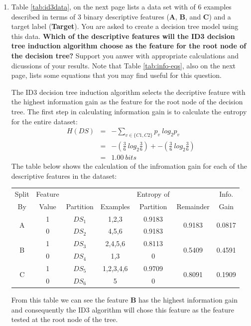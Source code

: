 \documentclass[solution]{ditpaper}
\begin{document}
\begin{enumerate}
\begin{enumerate}
     \end{enumerate}

		\item Table \ref{tab:id3data}, on the next page lists a data set with of 6 examples described in terms of 3 binary descriptive features (\textbf{A}, \textbf{B}, and \textbf{C}) and a target label (\textbf{Target}). You are asked to create a decision tree model using this data. \textbf{Which of the descriptive features will the ID3 decision tree induction algorithm choose as the feature for the root node of the decision tree?} Support you anwer with appropriate calculations and dicussions of your results. Note that Table \ref{tab:info-eqs}, also on the next page, lists some equations that you may find useful for this question.		
		\begin{answer}
		The ID3 decision tree induction algorithm selects the decriptive feature with the highest information gain as the feature for the root node of the decision tree.  The first step in calculating information gain is to calculate the entropy for the entire dataset:
	\begin{eqnarray*}
H\left(DS\right) &=& - \sum_{v \in \{C1,C2\}} p_v ~ log_2 p_v\\
		&=& -\left(\frac{3}{6}~ log_2 \frac{3}{6}\right) + -\left(\frac{3}{6} ~log_2 \frac{3}{6}\right)\\
		&=& 1.00~bits
	\end{eqnarray*}
	The table below shows the calculation of the infromation gain for each of the descriptive features in the dataset:
		\begin{scriptsize}
\begin{tabular}{ccccccc}
Split & Feature &              &  & Entropy of &  & Info.\\
By & Value & Partition  & Examples & Partition & Remainder & Gain\\
\hline
\multirow{2}{*}{A} & 1 & $DS_1$  & 1,2,3 & 0.9183 & \multirow{2}{*}{0.9183} & \multirow{2}{*}{0.0817}\\
 & 0 & $DS_2$ & 4,5,6 & 0.9183 &  & \\
\hline
\multirow{2}{*}{B} & 1 & $DS_3$ & 2,4,5,6 & 0.8113 & \multirow{2}{*}{0.5409} & \multirow{2}{*}{0.4591}\\
& 0 & $DS_4$ & 1,3 & 0 &  & \\
\hline
\multirow{2}{*}{C} & 1 & $DS_5$ & 1,2,3,4,6 & 0.9709 & \multirow{2}{*}{0.8091} & \multirow{2}{*}{0.1909}\\
& 0 & $DS_6$ & 5 & 0 &  & \\
\hline
\end{tabular}
	\end{scriptsize}
	From this table we can see the feature \textbf{B} has the highest information gain and consequently the ID3 algorithm will chose this feature as the feature tested at the root node of the tree.
		\end{answer}


\end{enumerate}
\end{document}
